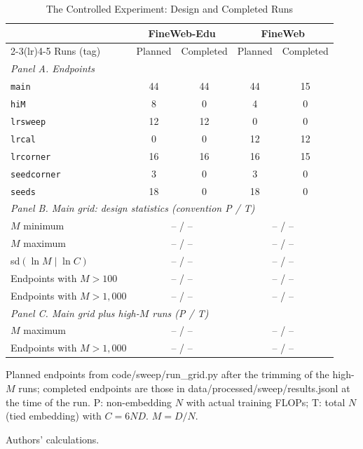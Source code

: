 \begin{table}[tp]
\centering
\caption{The Controlled Experiment: Design and Completed Runs}
\label{tab:m9-design}
\footnotesize
\setlength{\tabcolsep}{3pt}
\begin{tabular*}{\textwidth}{@{\extracolsep{\fill}}lcccc@{}}
\toprule
& \multicolumn{2}{c}{FineWeb-Edu} & \multicolumn{2}{c}{FineWeb} \\
\cmidrule(lr){2-3}\cmidrule(lr){4-5}
Runs (tag) & Planned & Completed & Planned & Completed \\
\midrule
\multicolumn{5}{l}{\emph{Panel A. Endpoints}} \\
\texttt{main} & 44 & 44 & 44 & 15 \\
\texttt{hiM} & 8 & 0 & 4 & 0 \\
\texttt{lrsweep} & 12 & 12 & 0 & 0 \\
\texttt{lrcal} & 0 & 0 & 12 & 12 \\
\texttt{lrcorner} & 16 & 16 & 16 & 15 \\
\texttt{seedcorner} & 3 & 0 & 3 & 0 \\
\texttt{seeds} & 18 & 0 & 18 & 0 \\
\multicolumn{5}{l}{\emph{Panel B. Main grid: design statistics (convention P / T)}} \\
$M$ minimum & \multicolumn{2}{c}{-- / --} & \multicolumn{2}{c}{-- / --} \\
$M$ maximum & \multicolumn{2}{c}{-- / --} & \multicolumn{2}{c}{-- / --} \\
sd$(\ln M\mid\ln C)$ & \multicolumn{2}{c}{-- / --} & \multicolumn{2}{c}{-- / --} \\
Endpoints with $M>100$ & \multicolumn{2}{c}{-- / --} & \multicolumn{2}{c}{-- / --} \\
Endpoints with $M>1{,}000$ & \multicolumn{2}{c}{-- / --} & \multicolumn{2}{c}{-- / --} \\
\multicolumn{5}{l}{\emph{Panel C. Main grid plus high-$M$ runs (P / T)}} \\
$M$ maximum & \multicolumn{2}{c}{-- / --} & \multicolumn{2}{c}{-- / --} \\
Endpoints with $M>1{,}000$ & \multicolumn{2}{c}{-- / --} & \multicolumn{2}{c}{-- / --} \\
\bottomrule
\end{tabular*}

\begin{tablenotes}
Planned endpoints from code/sweep/run\_grid.py after the trimming of the high-$M$ runs; completed endpoints are those in data/processed/sweep/results.jsonl at the time of the run. P: non-embedding $N$ with actual training FLOPs; T: total $N$ (tied embedding) with $C=6ND$. $M=D/N$.
\end{tablenotes}

\begin{tablenotes}[Source]
Authors' calculations.
\end{tablenotes}
\end{table}
